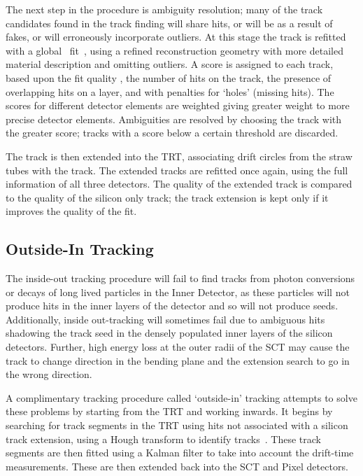 The next step in the procedure is ambiguity resolution; many of the track
candidates found in the track finding will share hits, or will be as a result of
fakes, or will erroneously incorporate outliers. At this stage the track is
refitted with a global \chisquared\ fit~\cite{1742-6596-119-3-032013}, using a
refined reconstruction geometry with more detailed material description and
omitting outliers.  A score is assigned to each track, based upon the fit
quality \chisquaredndof, the number of hits on the track, the presence of
overlapping hits on a layer, and with penalties for `holes' (missing hits). The
scores for different detector elements are weighted giving greater weight to
more precise detector elements. Ambiguities are resolved by choosing the track
with the greater score; tracks with a score below a certain threshold are
discarded.

The track is then extended into the TRT, associating drift circles from the
straw tubes with the track. The extended tracks are refitted once again, using
the full information of all three detectors. The quality of the extended track
is compared to the quality of the silicon only track; the track extension is
kept only if it improves the quality of the fit.

\subsection{Outside-In Tracking}

The inside-out tracking procedure will fail to find tracks from photon
conversions or decays of long lived particles in the Inner Detector, as these
particles will not produce hits in the inner layers of the detector and so will 
not produce seeds. Additionally, inside out-tracking will sometimes
fail due to ambiguous hits shadowing the track seed in the densely populated
inner layers of the silicon detectors. Further, high energy loss at the outer
radii of the SCT may cause the track to change direction in the bending plane
and the extension search to go in the wrong direction. 

A complimentary tracking procedure called `outside-in' tracking attempts to
solve these problems by starting from the TRT and working inwards. It begins by
searching for track segments in the TRT using hits not associated with a silicon
track extension, using a Hough transform to identify
tracks~\cite{Baines:683897}. These track segments are then fitted using a Kalman
filter to take into account the drift-time measurements. These are then extended
back into the SCT and Pixel detectors.
